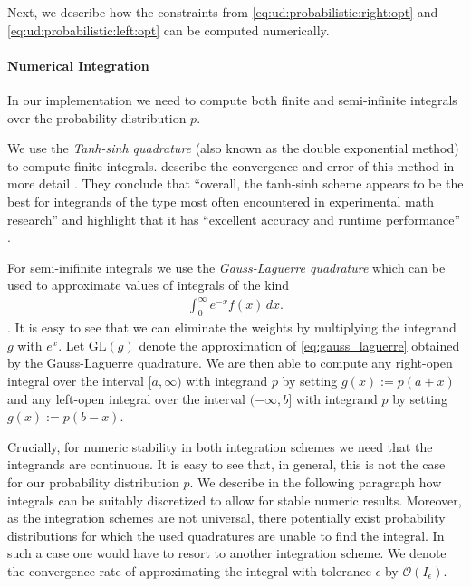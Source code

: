 Next, we describe how the constraints from \autoref{eq:ud:probabilistic:right:opt} and \autoref{eq:ud:probabilistic:left:opt} can be computed numerically.

\paragraph{Numerical Integration} In our implementation we need to compute both finite and semi-infinite integrals over the probability distribution $p$.

We use the \emph{Tanh-sinh quadrature} (also known as the double exponential method) to compute finite integrals. \citeauthor*{Bailey2005} describe the convergence and error of this method in more detail \cite{Bailey2005}. They conclude that ``overall, the tanh-sinh scheme appears to be the best
for integrands of the type most often encountered in experimental math research'' and highlight that it has ``excellent accuracy and runtime performance'' \cite{Bailey2005}.

For semi-inifinite integrals we use the \emph{Gauss-Laguerre quadrature} which can be used to approximate values of integrals of the kind \begin{align}\label{eq:gauss_laguerre}
    \int_0^{\infty} e^{-x} f(x) \,dx.
\end{align} \cite{Weisstein}. It is easy to see that we can eliminate the weights by multiplying the integrand $g$ with $e^x$. Let $\text{GL}(g)$ denote the approximation of \autoref{eq:gauss_laguerre} obtained by the Gauss-Laguerre quadrature. We are then able to compute any right-open integral over the interval $[{a,\infty})$ with integrand $p$ by setting $g(x) := p(a+x)$ and any left-open integral over the interval $({-\infty,b}]$ with integrand $p$ by setting $g(x) := p(b-x)$.

Crucially, for numeric stability in both integration schemes we need that the integrands are continuous. It is easy to see that, in general, this is not the case for our probability distribution $p$. We describe in the following paragraph how integrals can be suitably discretized to allow for stable numeric results. Moreover, as the integration schemes are not universal, there potentially exist probability distributions for which the used quadratures are unable to find the integral. In such a case one would have to resort to another integration scheme. We denote the convergence rate of approximating the integral with tolerance $\epsilon$ by $\mathcal{O}(I_{\epsilon})$.

